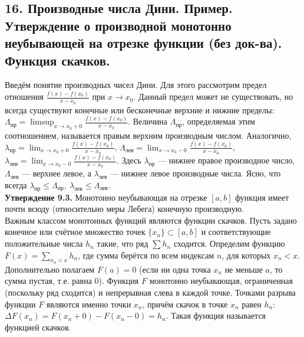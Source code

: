 \documentclass[12pt]{article}
\begin{document}
\subsection*{16. Производные числа Дини. Пример. Утверждение о производной монотонно
неубывающей на отрезке функции (без док-ва). Функция скачков.}
Введём понятие производных чисел Дини. Для этого рассмотрим предел отношения \(\frac{f(x)-f(x_0)}{x-x_0}\) при \(x \to x_0\). Данный предел может не существовать, но всегда существуют конечные или бесконечные верхние и нижние пределы: \(\Lambda_{\text{пр}} = \limsup_{x \to x_0+0} \frac{f(x)-f(x_0)}{x-x_0}\). Величина \(\Lambda_{\text{пр}}\), определяемая этим соотношением, называется правым верхним производным числом. Аналогично, \(\lambda_{\text{пр}} = \lim_{x \to x_0+0} \frac{f(x)-f(x_0)}{x-x_0}\), \(\Lambda_{\text{лев}} = \lim_{x \to x_0-0} \frac{f(x)-f(x_0)}{x-x_0}\), \(\lambda_{\text{лев}} = \lim_{x \to x_0-0} \frac{f(x)-f(x_0)}{x-x_0}\). Здесь \(\lambda_{\text{пр}}\) — нижнее правое производное число, \(\Lambda_{\text{лев}}\) — верхнее левое, а \(\lambda_{\text{лев}}\) — нижнее левое производные числа. Ясно, что всегда \(\lambda_{\text{пр}} \leq \Lambda_{\text{пр}}, \ \lambda_{\text{лев}} \leq \Lambda_{\text{лев}}\). \\\textbf{Утверждение 9.3.} Монотонно неубывающая на отрезке \([a,b]\) функция имеет почти всюду (относительно меры Лебега) конечную производную.\\Важным классом монотонных функций являются функции скачков. Пусть задано конечное или счётное множество точек \(\{x_n\} \subset [a,b]\) и соответствующие положительные числа \(h_n\) такие, что ряд \(\sum h_n\) сходится. Определим функцию \(F(x) = \sum_{x_n < x} h_n\), где сумма берётся по всем индексам \(n\), для которых \(x_n < x\). Дополнительно полагаем \(F(a)=0\) (если ни одна точка \(x_n\) не меньше \(a\), то сумма пустая, т.е. равна 0). Функция \(F\) монотонно неубывающая, ограниченная (поскольку ряд сходится) и непрерывная слева в каждой точке. Точками разрыва функции \(F\) являются именно точки \(x_n\), причём скачок в точке \(x_n\) равен \(h_n\): \(\Delta F(x_n) = F(x_n+0) - F(x_n-0) = h_n\). Такая функция называется функцией скачков.

\end{document}
